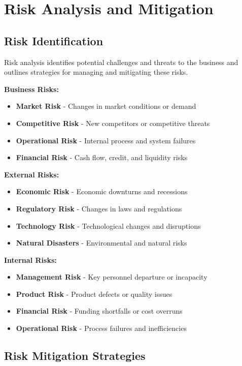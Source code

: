 \documentclass[12pt]{article}
\begin{document}
\section{Risk Analysis and Mitigation}

\subsection{Risk Identification}
Risk analysis identifies potential challenges and threats to the business and outlines strategies for managing and mitigating these risks.

\textbf{Business Risks:}
\begin{itemize}
    \item \textbf{Market Risk} - Changes in market conditions or demand
    \item \textbf{Competitive Risk} - New competitors or competitive threats
    \item \textbf{Operational Risk} - Internal process and system failures
    \item \textbf{Financial Risk} - Cash flow, credit, and liquidity risks
\end{itemize}

\textbf{External Risks:}
\begin{itemize}
    \item \textbf{Economic Risk} - Economic downturns and recessions
    \item \textbf{Regulatory Risk} - Changes in laws and regulations
    \item \textbf{Technology Risk} - Technological changes and disruptions
    \item \textbf{Natural Disasters} - Environmental and natural risks
\end{itemize}

\textbf{Internal Risks:}
\begin{itemize}
    \item \textbf{Management Risk} - Key personnel departure or incapacity
    \item \textbf{Product Risk} - Product defects or quality issues
    \item \textbf{Financial Risk} - Funding shortfalls or cost overruns
    \item \textbf{Operational Risk} - Process failures and inefficiencies
\end{itemize}

\subsection{Risk Mitigation Strategies}
\end{document}

